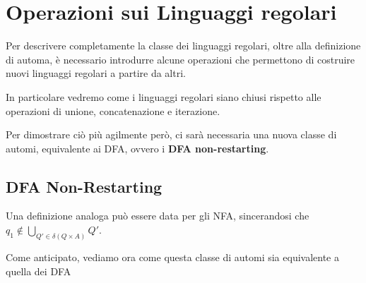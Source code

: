 \chapter{Operazioni sui Linguaggi regolari}

Per descrivere completamente la classe dei linguaggi regolari, oltre alla definizione di automa, è necessario introdurre alcune operazioni che permettono di costruire nuovi linguaggi regolari a partire da altri.

In particolare vedremo come i linguaggi regolari siano chiusi rispetto alle operazioni di unione, concatenazione e iterazione.

Per dimostrare ciò più agilmente però, ci sarà necessaria una nuova classe di automi, equivalente ai DFA, ovvero i \textbf{DFA non-restarting}.

\section{DFA Non-Restarting}


Una definizione analoga può essere data per gli NFA, sincerandosi che \(q_1 \nin \bigcup\limits_{Q' \in \delta(Q \times A)} Q'\).

Come anticipato, vediamo ora come questa classe di automi sia equivalente a quella dei DFA

